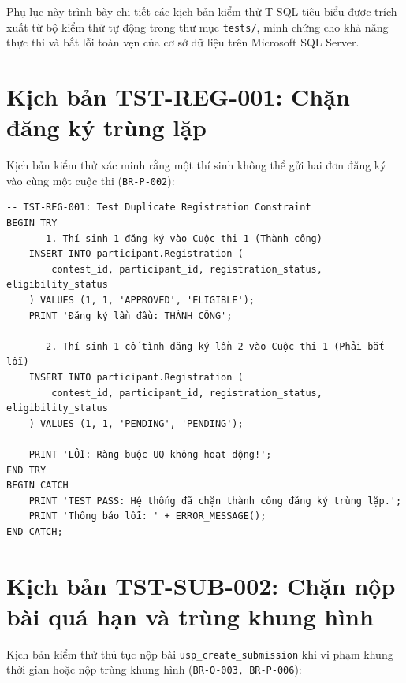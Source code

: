 
Phụ lục này trình bày chi tiết các kịch bản kiểm thử T-SQL tiêu biểu được trích xuất từ bộ kiểm thử tự động trong thư mục \texttt{tests/}, minh chứng cho khả năng thực thi và bắt lỗi toàn vẹn của cơ sở dữ liệu trên Microsoft SQL Server.

\section{Kịch bản TST-REG-001: Chặn đăng ký trùng lặp}
\label{a:tst_reg_001}

Kịch bản kiểm thử xác minh rằng một thí sinh không thể gửi hai đơn đăng ký vào cùng một cuộc thi (\texttt{BR-P-002}):

\begin{verbatim}
-- TST-REG-001: Test Duplicate Registration Constraint
BEGIN TRY
    -- 1. Thí sinh 1 đăng ký vào Cuộc thi 1 (Thành công)
    INSERT INTO participant.Registration (
        contest_id, participant_id, registration_status, eligibility_status
    ) VALUES (1, 1, 'APPROVED', 'ELIGIBLE');
    PRINT 'Đăng ký lần đầu: THÀNH CÔNG';

    -- 2. Thí sinh 1 cố tình đăng ký lần 2 vào Cuộc thi 1 (Phải bắt lỗi)
    INSERT INTO participant.Registration (
        contest_id, participant_id, registration_status, eligibility_status
    ) VALUES (1, 1, 'PENDING', 'PENDING');
    
    PRINT 'LỖI: Ràng buộc UQ không hoạt động!';
END TRY
BEGIN CATCH
    PRINT 'TEST PASS: Hệ thống đã chặn thành công đăng ký trùng lặp.';
    PRINT 'Thông báo lỗi: ' + ERROR_MESSAGE();
END CATCH;
\end{verbatim}

\section{Kịch bản TST-SUB-002: Chặn nộp bài quá hạn và trùng khung hình}
\label{a:tst_sub_002}

Kịch bản kiểm thử thủ tục nộp bài \texttt{usp\_create\_submission} khi vi phạm khung thời gian hoặc nộp trùng khung hình (\texttt{BR-O-003, BR-P-006}):

